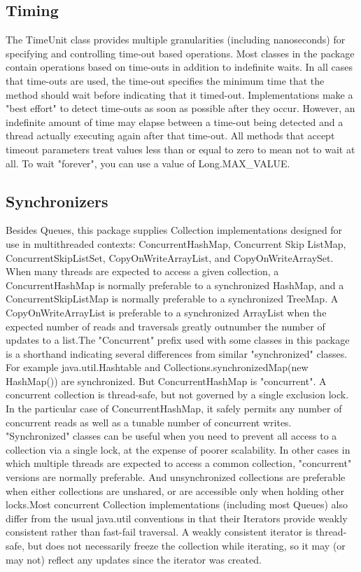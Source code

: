 \subsection{Timing}
The TimeUnit class provides multiple granularities (including nanoseconds) for specifying and controlling time-out based operations. Most classes in the package contain operations based on time-outs in addition to indefinite waits. In all cases that time-outs are used, the time-out specifies the minimum time that the method should wait before indicating that it timed-out. Implementations make a "best effort" to detect time-outs as soon as possible after they occur. However, an indefinite amount of time may elapse between a time-out being detected and a thread actually executing again after that time-out. All methods that accept timeout parameters treat values less than or equal to zero to mean not to wait at all. To wait "forever", you can use a value of Long.MAX_VALUE.


\subsection{Synchronizers}

Besides Queues, this package supplies Collection implementations designed for use in multithreaded contexts: ConcurrentHashMap, Concurrent Skip ListMap, ConcurrentSkipListSet, CopyOnWriteArrayList, and CopyOnWriteArraySet. When many threads are expected to access a given collection, a ConcurrentHashMap is normally preferable to a synchronized HashMap, and a ConcurrentSkipListMap is normally preferable to a synchronized TreeMap. A CopyOnWriteArrayList is preferable to a synchronized ArrayList when the expected number of reads and traversals greatly outnumber the number of updates to a list.The "Concurrent" prefix used with some classes in this package is a shorthand indicating several differences from similar "synchronized" classes. For example java.util.Hashtable and Collections.synchronizedMap(new HashMap()) are synchronized. But ConcurrentHashMap is "concurrent". A concurrent collection is thread-safe, but not governed by a single exclusion lock. In the particular case of ConcurrentHashMap, it safely permits any number of concurrent reads as well as a tunable number of concurrent writes. "Synchronized" classes can be useful when you need to prevent all access to a collection via a single lock, at the expense of poorer scalability. In other cases in which multiple threads are expected to access a common collection, "concurrent" versions are normally preferable. And unsynchronized collections are preferable when either collections are unshared, or are accessible only when holding other locks.Most concurrent Collection implementations (including most Queues) also differ from the usual java.util conventions in that their Iterators provide weakly consistent rather than fast-fail traversal. A weakly consistent iterator is thread-safe, but does not necessarily freeze the collection while iterating, so it may (or may not) reflect any updates since the iterator was created.


